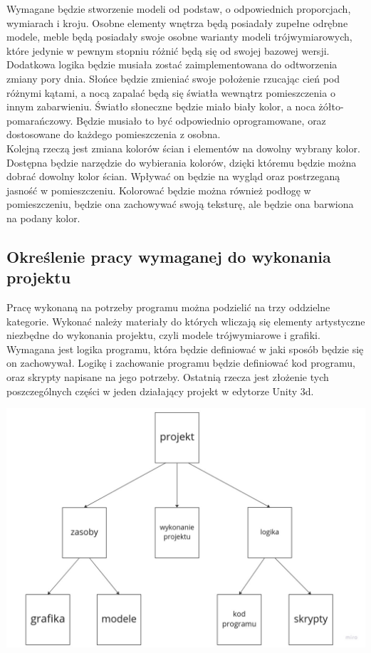 \documentclass{article} %
\begin{document}
        Wymagane będzie stworzenie modeli od podstaw, o odpowiednich proporcjach, wymiarach i kroju. Osobne elementy wnętrza będą posiadały zupełne odrębne modele, meble będą posiadały swoje osobne warianty modeli trójwymiarowych, które jedynie w pewnym stopniu różnić będą się od swojej bazowej wersji.
        \\
        
        Dodatkowa logika będzie musiała zostać zaimplementowana do odtworzenia zmiany pory dnia. Słońce będzie zmieniać swoje położenie rzucając cień pod różnymi kątami, a nocą zapalać będą się światła wewnątrz pomieszczenia o innym zabarwieniu. Światło słoneczne będzie miało biały kolor, a noca żółto-pomarańczowy. Będzie musiało to być odpowiednio oprogramowane, oraz dostosowane do każdego pomieszczenia z osobna.
        \\
        
        Kolejną rzeczą jest zmiana kolorów ścian i elementów na dowolny wybrany kolor. Dostępna będzie narzędzie do wybierania kolorów, dzięki któremu będzie można dobrać dowolny kolor ścian. Wpływać on będzie na wygląd oraz postrzeganą jasność w pomieszczeniu. Kolorować będzie można również podłogę w pomieszczeniu, będzie ona zachowywać swoją teksturę, ale będzie ona barwiona na podany kolor.
        \\
        
    \subsection{Określenie pracy wymaganej do wykonania projektu}
        Pracę wykonaną na potrzeby programu można podzielić na trzy oddzielne kategorie. Wykonać należy materiały do których wliczają się elementy artystyczne niezbędne do wykonania projektu, czyli modele trójwymiarowe i grafiki. Wymagana jest logika programu, która będzie definiować w jaki sposób będzie się on zachowywał. Logikę i zachowanie programu będzie definiować kod programu, oraz skrypty napisane na jego potrzeby. Ostatnią rzecza jest złożenie tych poszczególnych części w jeden działający projekt w edytorze Unity 3d.
        \\
        
        \begin{center}
            \includegraphics[scale=0.3,keepaspectratio]{images/diagrams/1 Project work categories.jpg}
        \end{center}
\end{document}
